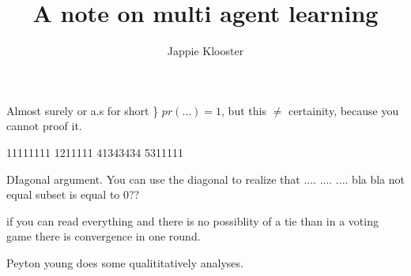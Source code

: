 \documentclass{article}
\begin{document}
\author{Jappie Klooster}
\title{A note on multi agent learning}

\maketitle

Almost surely or a.s for short \} $pr(\dots) = 1$, but this $\neq$ certainity,
because you cannot proof it.

11111111
1211111
41343434
5311111

DIagonal argument. You can use the diagonal to realize
that .... .... .... bla bla not equal subset is equal to 0??

if you can read everything and there is no possiblity of a tie than in a
voting game there is convergence in one round.

Peyton young does some qualititatively analyses.
\end{document}
